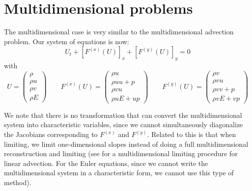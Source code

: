\section{Multidimensional problems}

The multidimensional case is very similar to the multidimensional
advection problem.  Our system of equations is now:
\begin{equation}
U_t + [F^{(x)}(U)]_x + [F^{(y)}(U)]_y = 0
\end{equation}
with
\begin{equation}
U = \left ( \begin{array}{c} \rho \\ \rho u \\ \rho v \\ \rho E \end{array} \right )
%
\qquad
%
F^{(x)}(U) = \left ( \begin{array}{c} \rho u \\ \rho uu + p \\ \rho v u \\ \rho u E + up \end{array} \right )
%
\qquad
F^{(y)}(U) = \left ( \begin{array}{c} \rho v \\ \rho vu     \\ \rho v v + p \\ \rho v E + vp \end{array} \right )
\end{equation}

We note that there is no transformation that can convert the multidimensional
system into characteristic variables, since we cannot simultaneously
diagonalize the Jacobians corresponding to $F^{(x)}$ and $F^{(y)}$.  Related
to this is that when limiting, we limit one-dimensional slopes instead of
doing a full multidimensional reconstruction and limiting (see \cite{BDS}
for a multidimensional limiting procedure for linear advection.  For
the Euler equations, since we cannot write the multidimensional system
in a characteristic form, we cannot use this type of method).

